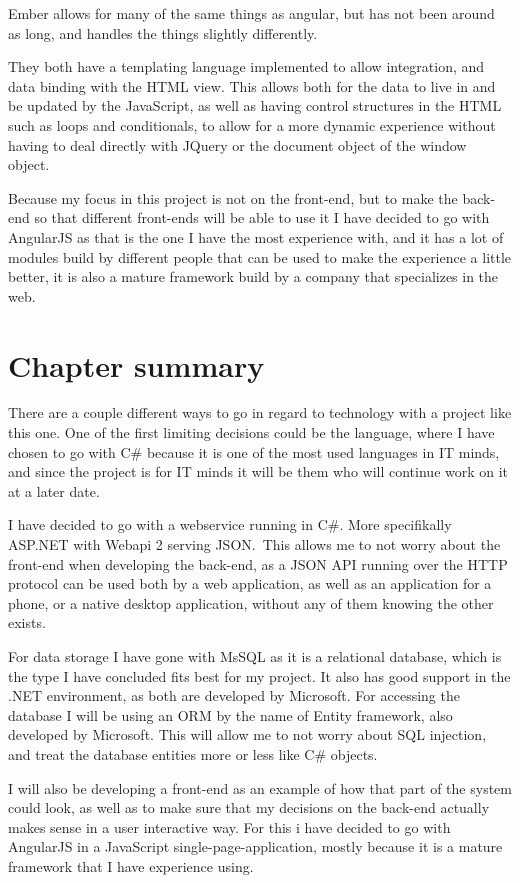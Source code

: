 Ember allows for many of the same things as angular, but has not been around as
long, and handles the things slightly differently\cite{emberjs}. 

They both have a templating language implemented to allow integration, and
data binding with the HTML view. This allows both for the data to live in and be
updated by the JavaScript, as well as having control structures in the HTML such
as loops and conditionals, to allow for a more dynamic experience without having
to deal directly with JQuery or the document object of the window object. 

Because my focus in this project is not on the front-end, but to make the back-end
so that different front-ends will be able to use it I have decided to go with
AngularJS as that is the one I have the most experience with, and it has a lot
of modules build by different people that can be used to make the experience a
little better, it is also a mature framework build by a company that specializes
in the web. 

\section{Chapter summary }
There are a couple different ways to go in regard to technology with a project
like this one. One of the first limiting decisions could be the language, where
I have chosen to go with C\# because it is one of the most used languages in IT
minds, and since the project is for IT minds it will be them who will continue
work on it at a later date.

I have decided to go with a webservice running in C\#. More specifikally
ASP.NET with Webapi 2 serving JSON.\ This allows me to not worry about the
front-end when developing the back-end, as a JSON API running over the HTTP
protocol can be used both by a web application, as well as an application for a
phone, or a native desktop application, without any of them knowing the other exists.

For data storage I have gone with MsSQL as it is a relational database, which is
the type I have concluded fits best for my project. It also has good support in
the .NET environment, as both are developed by Microsoft. For accessing the
database I will be using an ORM by the name of Entity framework, also developed
by Microsoft. This will allow me to not worry about SQL injection, and treat the
database entities more or less like C\# objects.

I will also be developing a front-end as an example of how that part of the
system could look, as well as to make sure that my decisions on the back-end
actually makes sense in a user interactive way. For this i have decided
to go with AngularJS in a JavaScript single-page-application, mostly because it is
a mature framework that I have experience using.
